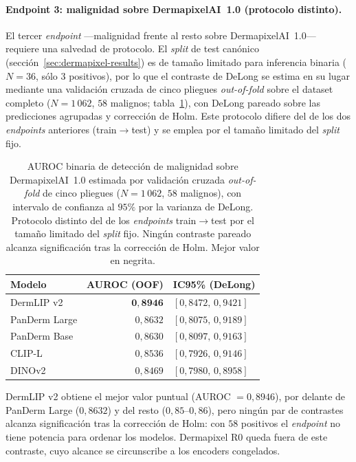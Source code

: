 \paragraph{Endpoint 3: malignidad sobre DermapixelAI~1.0 (protocolo
distinto).} El tercer \emph{endpoint} ---malignidad frente al resto
sobre DermapixelAI~1.0--- requiere una salvedad de protocolo. El
\emph{split} de test canónico (sección~\ref{sec:dermapixel-results}) es
de tamaño limitado para inferencia binaria ($N = 36$, sólo $3$
positivos), por lo que el contraste de DeLong se estima en su lugar
mediante una validación cruzada de cinco pliegues
\emph{out-of-fold} sobre el dataset completo ($N = 1\,062$, $58$
malignos; tabla~\ref{tab:delong-dermapixel}), con DeLong pareado sobre
las predicciones agrupadas y corrección de Holm. Este protocolo difiere del de los dos
\emph{endpoints} anteriores (train$\to$test) y se emplea por el
tamaño limitado del \emph{split} fijo.

\begin{table}[htbp]
\centering
\footnotesize
\setlength{\tabcolsep}{4pt}
\renewcommand{\arraystretch}{0.95}
\caption{AUROC binaria de detección de malignidad sobre DermapixelAI~1.0
estimada por validación cruzada \emph{out-of-fold} de cinco pliegues
($N = 1\,062$, $58$ malignos), con intervalo de confianza al $95\%$ por
la varianza de DeLong. Protocolo distinto del de los \emph{endpoints}
train$\to$test por el tamaño limitado del \emph{split} fijo. Ningún
contraste pareado alcanza significación tras la corrección de Holm.
Mejor valor en negrita.}
\label{tab:delong-dermapixel}
\begin{tabular}{lrl}
\hline
Modelo          & AUROC (OOF)         & IC95\% (DeLong) \\
\hline
DermLIP v2      & $\mathbf{0{,}8946}$ & $[0{,}8472,\, 0{,}9421]$ \\
PanDerm Large   & $0{,}8632$          & $[0{,}8075,\, 0{,}9189]$ \\
PanDerm Base    & $0{,}8630$          & $[0{,}8097,\, 0{,}9163]$ \\
CLIP-L          & $0{,}8536$          & $[0{,}7926,\, 0{,}9146]$ \\
DINOv2          & $0{,}8469$          & $[0{,}7980,\, 0{,}8958]$ \\
\hline
\end{tabular}
\end{table}

DermLIP v2 obtiene el mejor valor puntual (AUROC $= 0{,}8946$), por
delante de PanDerm Large ($0{,}8632$) y del resto ($0{,}85$--$0{,}86$),
pero ningún par de contrastes alcanza significación tras la corrección
de Holm: con $58$ positivos el \emph{endpoint} no tiene potencia para
ordenar los modelos. Dermapixel R0 queda fuera de este contraste, cuyo
alcance se circunscribe a los encoders congelados.

